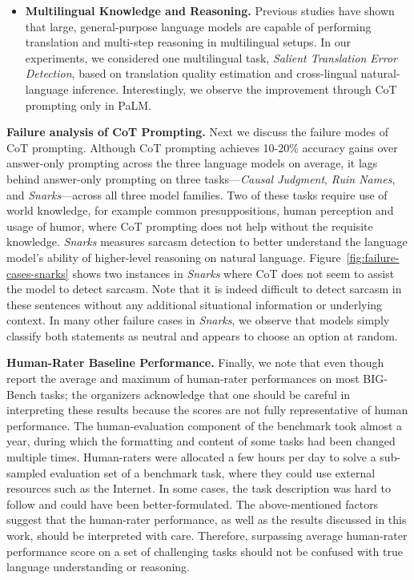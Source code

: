 \begin{itemize}
    \item \textbf{Multilingual Knowledge and Reasoning.} Previous studies \citep{winata2021language,Shi2022LanguageMA} have shown that large, general-purpose language models are capable of performing translation and multi-step reasoning in multilingual setups. In our experiments, we considered one multilingual task, \emph{Salient Translation Error Detection}, based on translation quality estimation and cross-lingual natural-language inference. Interestingly, we observe the improvement through CoT prompting only in PaLM. 
\end{itemize}

\textbf{Failure analysis of CoT Prompting.} Next we discuss the failure modes of CoT prompting. Although CoT prompting achieves 10-20\% accuracy gains over answer-only prompting across the three language models on average, it lags behind answer-only prompting on three tasks---\emph{Causal Judgment}, \emph{Ruin Names}, and \emph{Snarks}---across all three model families. Two of these tasks require use of world knowledge, for example common presuppositions, human perception and usage of humor, where CoT prompting does not help without the requisite knowledge. \emph{Snarks} measures sarcasm detection to better understand the language model's ability of higher-level reasoning on natural language. Figure~\ref{fig:failure-cases-snarks} shows two instances in \emph{Snarks} where CoT does not seem to assist the model to detect sarcasm. Note that it is indeed difficult to detect sarcasm in these sentences without any additional situational information or underlying context. In many other failure cases in \emph{Snarks}, we observe that models simply classify both statements as neutral and appears to choose an option at random.

\textbf{Human-Rater Baseline Performance.} Finally, we note that even though \citet{srivastava2022beyond} report the average and maximum of human-rater performances on most BIG-Bench tasks; the organizers acknowledge that one should be careful in interpreting these results because the scores are not fully representative of human performance. The human-evaluation component of the benchmark took almost a year, during which the formatting and content of some tasks had been changed multiple times. Human-raters were allocated a few hours per day to solve a sub-sampled evaluation set of a benchmark task, where they could use external resources such as the Internet. In some cases, the task description was hard to follow and could have been better-formulated. The above-mentioned factors suggest that the human-rater performance, as well as the results discussed in this work, should be interpreted with care. Therefore, surpassing average human-rater performance score on a set of challenging tasks should not be confused with true language understanding or reasoning.

